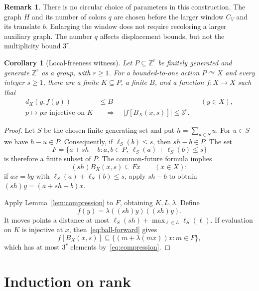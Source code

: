 \documentclass[11pt,letterpaper]{article}
\newtheorem{corollary}[theorem]{Corollary}
\theoremstyle{definition}
\newtheorem{remark}[theorem]{Remark}
\newcommand{\ZZ}{\mathbb Z}
\newcommand{\act}{\curvearrowright}
\begin{document}
\begin{remark}\label{rem:parameters}
There is no circular choice of parameters in this construction. The graph
$H$ and its number of colors $q$ are chosen before the larger window $C_V$
and its translate $b$. Enlarging the window does not require recoloring a
larger auxiliary graph. The number $q$ affects displacement bounds, but
not the multiplicity bound $3^r$.
\end{remark}

\begin{corollary}[Local-freeness witness]\label{cor:local}
Let $P\subseteq\ZZ^r$ be finitely generated and generate $\ZZ^r$ as a
group, with $r\ge1$. For a bounded-to-one action $P\act X$ and every
integer $s\ge1$, there are a finite $K\subseteq P$, a finite $B$, and a
function $f:X\to X$ such that
\begin{align}
 d_X(y,f(y))&\le B &&(y\in X),\label{eq:displacement}\\
 p\mapsto px\text{ injective on }K
 &\quad\Longrightarrow\quad |f[B_X(x,s)]|\le3^r.
 \label{eq:local-multiplicity}
\end{align}
\end{corollary}

\begin{proof}
Let $S$ be the chosen finite generating set and put $h=\sum_{u\in S}u$.
For $u\in S$ we have $h-u\in P$. Consequently, if $\ell_S(b)\le s$, then
$sh-b\in P$. The set
\[
 F=\{a+sh-b:a,b\in P,\ \ell_S(a)+\ell_S(b)\le s\}
\]
is therefore a finite subset of $P$. The common-future formula implies
\begin{equation}\label{eq:ball-forward}
 (sh)B_X(x,s)\subseteq Fx\qquad(x\in X):
\end{equation}
if $ax=by$ with $\ell_S(a)+\ell_S(b)\le s$, apply $sh-b$ to obtain
$(sh)y=(a+sh-b)x$.

Apply Lemma~\ref{lem:compression} to $F$, obtaining $K,L,\lambda$. Define
\[
 f(y)=\lambda((sh)y)((sh)y).
\]
It moves points a distance at most
$\ell_S(sh)+\max_{\ell\in L}\ell_S(\ell)$. If evaluation on $K$ is
injective at $x$, then~\eqref{eq:ball-forward} gives
\[
 f[B_X(x,s)]
 \subseteq\{(m+\lambda(mx))x:m\in F\},
\]
which has at most $3^r$ elements by~\eqref{eq:compression}.
\end{proof}

\section{Induction on rank}\label{sec:induction}
\end{document}
